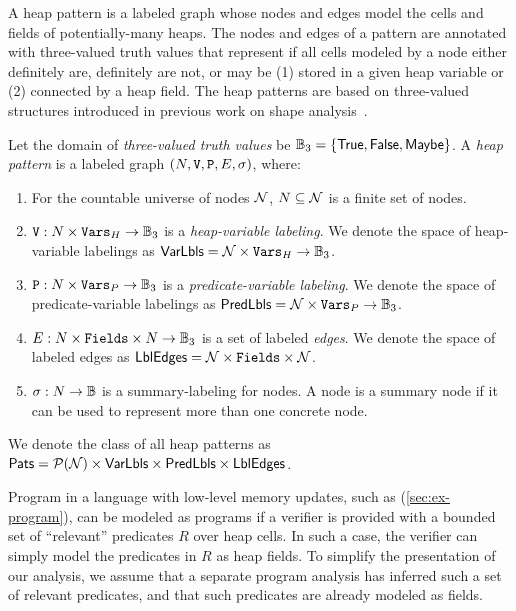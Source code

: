 A heap pattern is a labeled graph whose nodes and edges model the
cells and fields of potentially-many heaps.
%
The nodes and edges of a pattern are annotated with three-valued truth
values that represent if all cells modeled by a node either definitely
are, definitely are not, or may be (1) stored in a given heap variable
or (2) connected by a heap field.
%
The heap patterns are based on three-valued structures introduced in
previous work on shape analysis~\cite{sagiv02}.
%
\begin{defn}
  \label{defn:pattern}
  Let the domain of \emph{three-valued truth values} be $\mathbb{B}_3 =
  \{ \mathsf{True}, \mathsf{False}, \mathsf{Maybe} \}$.
  A \emph{heap pattern} is a labeled graph $(N, \mathtt{V},
  \mathtt{P}, E, \sigma)$, where:
  \begin{enumerate}
  \item
    For the countable universe of nodes $\mathcal{N}$, $N
    \subseteq \mathcal{N}$ is a finite set of nodes.
  \item
    $\mathtt{V}: N \times \mathtt{Vars}_H \to \mathbb{B}_3$ is a
    \emph{heap-variable labeling}.
    We denote the space of heap-variable labelings as $\mathsf{VarLbls} =
    \mathcal{N} \times \mathtt{Vars}_H \to \mathbb{B}_3$.
  \item
    $\mathtt{P}: N \times \mathtt{Vars}_P \to \mathbb{B}_3$ is a
    \emph{predicate-variable labeling}.
    We denote the space of predicate-variable labelings as $\mathsf{PredLbls} =
    \mathcal{N} \times \mathtt{Vars}_P \to \mathbb{B}_3$.
  \item
    $E: N \times \mathtt{Fields} \times N \to \mathbb{B}_3$ is a set of
    labeled \emph{edges}.
    We denote the space of labeled edges as $\mathsf{LblEdges} = \mathcal{N}
    \times \mathtt{Fields} \times \mathcal{N}$.
  \item
    $\sigma: N \to \mathbb{B}$ is a summary-labeling for nodes. A node is a summary node if it can be used to represent more than one concrete node.
  \end{enumerate}
  We denote the class of all heap patterns as $\mathsf{Pats} =
  \mathcal{P}(\mathcal{N}) \times \mathsf{VarLbls} \times \mathsf{PredLbls} \times \mathsf{LblEdges}$.
\end{defn}

Program in a language with low-level memory updates, such as \altlist
(\autoref{sec:ex-program}), can be modeled as \lang programs if a
verifier is provided with a bounded set of ``relevant'' predicates $R$
over heap cells.
%
In such a case, the verifier can simply model the predicates in $R$ as
heap fields.
%
To simplify the presentation of our analysis, we assume that a
separate program analysis has inferred such a set of relevant
predicates, and that such predicates are already modeled as \lang
fields.
%


